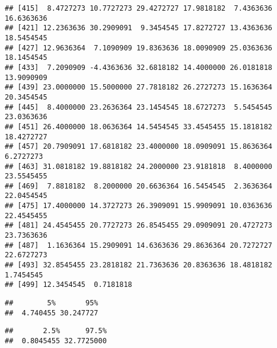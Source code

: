 \documentclass[]{book}
\newenvironment{Shaded}{\begin{snugshade}}{\end{snugshade}}
\newcommand{\CommentTok}[1]{\textcolor[rgb]{0.56,0.35,0.01}{\textit{#1}}}
\newcommand{\FloatTok}[1]{\textcolor[rgb]{0.00,0.00,0.81}{#1}}
\newcommand{\KeywordTok}[1]{\textcolor[rgb]{0.13,0.29,0.53}{\textbf{#1}}}
\newcommand{\NormalTok}[1]{#1}
\begin{document}
\begin{verbatim}
## [415]  8.4727273 10.7727273 29.4272727 17.9818182  7.4363636 16.6363636
## [421] 12.2363636 30.2909091  9.3454545 17.8272727 13.4363636 18.5454545
## [427] 12.9636364  7.1090909 19.8363636 18.0090909 25.0363636 18.1454545
## [433]  7.2090909 -4.4363636 32.6818182 14.4000000 26.0181818 13.9090909
## [439] 23.0000000 15.5000000 27.7818182 26.2727273 15.1636364 20.3454545
## [445]  8.4000000 23.2636364 23.1454545 18.6727273  5.5454545 23.0363636
## [451] 26.4000000 18.0636364 14.5454545 33.4545455 15.1818182 18.4272727
## [457] 20.7909091 17.6818182 23.4000000 18.0909091 15.8636364  6.2727273
## [463] 31.0818182 19.8818182 24.2000000 23.9181818  8.4000000 23.5545455
## [469]  7.8818182  8.2000000 20.6636364 16.5454545  2.3636364 22.0454545
## [475] 17.4000000 14.3727273 26.3909091 15.9909091 10.0363636 22.4545455
## [481] 24.4545455 20.7727273 26.8545455 29.0909091 20.4727273 23.7363636
## [487]  1.1636364 15.2909091 14.6363636 29.8636364 20.7272727 22.6727273
## [493] 32.8545455 23.2818182 21.7363636 20.8363636 18.4818182  1.7454545
## [499] 12.3454545  0.7181818
\end{verbatim}

\begin{Shaded}
\end{Shaded}

\begin{verbatim}
##        5%       95% 
##  4.740455 30.247727
\end{verbatim}

\begin{Shaded}
\end{Shaded}

\begin{verbatim}
##       2.5%      97.5% 
##  0.8045455 32.7725000
\end{verbatim}

\begin{Shaded}
\end{Shaded}
\end{document}
